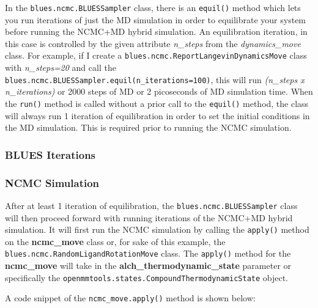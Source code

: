 In the \texttt{blues.ncmc.BLUESSampler} class, there is an \texttt{equil()} method which lets you run iterations of just the MD simulation in order to equilibrate your system before running the NCMC+MD hybrid simulation. 
An equilibration iteration, in this case is controlled by the given attribute \emph{n\_steps} from the \emph{dynamics\_move} class.
For example, if I create a \texttt{blues.ncmc.ReportLangevinDynamicsMove} class with \emph{n\_steps=20} and call the \texttt{blues.ncmc.BLUESSampler.equil(n_iterations=100)}, this will run \emph{(n\_steps x n\_iterations)} or 2000 steps of MD or 2 picoseconds of MD simulation time.
When the \texttt{run()} method is called without a prior call to the \texttt{equil()} method, the class will always run 1 iteration of equilibration in order to set the initial conditions in the MD simulation.
This is required prior to running the NCMC simulation.

\hypertarget{blues-iterations}{%
\subsubsection{BLUES Iterations}\label{blues-iterations}}

\subsubsection{NCMC Simulation}

After at least 1 iteration of equilibration, the \texttt{blues.ncmc.BLUESSampler} class will then proceed forward with running iterations of the NCMC+MD hybrid simulation.
It will first run the NCMC simulation by calling the \texttt{apply()} method on the \textbf{ncmc\_move} class or, for sake of this example, the \texttt{blues.ncmc.RandomLigandRotationMove} class.
The \texttt{apply()} method for the \textbf{ncmc\_move} will take in the \textbf{alch\_thermodynamic\_state} parameter or specifically the \texttt{openmmtools.states.CompoundThermodynamicState} object.

A code snippet of the \texttt{ncmc_move.apply()} method is shown below:

